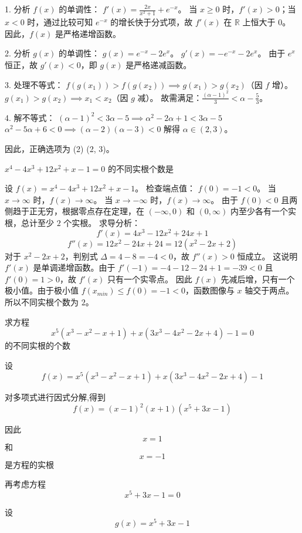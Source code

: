 \begin{questions}
\begin{solution}
1. 分析 $f(x)$ 的单调性：
$f'(x) = \frac{2x}{x^2+1} + e^{-x}$。
当 $x \geq 0$ 时，$f'(x) > 0$；当 $x < 0$ 时，通过比较可知 $e^{-x}$ 的增长快于分式项，故 $f'(x)$ 在 $\mathbb{R}$ 上恒大于 0。
因此，$f(x)$ 是严格递增函数。

2. 分析 $g(x)$ 的单调性：
$g(x) = e^{-x} - 2e^x$。
$g'(x) = -e^{-x} - 2e^x$。
由于 $e^x$ 恒正，故 $g'(x) < 0$，即 $g(x)$ 是严格递减函数。

3. 处理不等式：
$f(g(x_1)) > f(g(x_2)) \implies g(x_1) > g(x_2)$（因 $f$ 增）。
$g(x_1) > g(x_2) \implies x_1 < x_2$（因 $g$ 减）。
故需满足：$\frac{(\alpha-1)^2}{3} < \alpha - \frac{5}{3}$。

4. 解不等式：
$(\alpha-1)^2 < 3\alpha - 5 \implies \alpha^2 - 2\alpha + 1 < 3\alpha - 5$
$\alpha^2 - 5\alpha + 6 < 0 \implies (\alpha-2)(\alpha-3) < 0$
解得 $\alpha \in (2, 3)$。

因此，正确选项为 (2) (2, 3)。
\end{solution}

\question $x^4 - 4x^3 + 12x^2 + x - 1 = 0$ 的不同实根个数是

\begin{solution}
设 $f(x) = x^4 - 4x^3 + 12x^2 + x - 1$。
检查端点值：
$f(0) = -1 < 0$。
当 $x \to \infty$ 时，$f(x) \to \infty$。
当 $x \to -\infty$ 时，$f(x) \to \infty$。
由于 $f(0) < 0$ 且两侧趋于正无穷，根据零点存在定理，在 $(-\infty, 0)$ 和 $(0, \infty)$ 内至少各有一个实根，总计至少 $2$ 个实根。
求导分析：
\[
f'(x) = 4x^3 - 12x^2 + 24x + 1
\]
\[
f''(x) = 12x^2 - 24x + 24 = 12\left(x^2 - 2x + 2\right)
\]
对于 $x^2 - 2x + 2$，判别式 $\Delta = 4 - 8 = -4 < 0$，故 $f''(x) > 0$ 恒成立。
这说明 $f'(x)$ 是单调递增函数。由于 $f'(-1) = -4-12-24+1 = -39 < 0$ 且 $f'(0) = 1 > 0$，故 $f'(x)$ 只有一个实零点。
因此 $f(x)$ 先减后增，只有一个极小值。由于极小值 $f(x_{min}) \le f(0) = -1 < 0$，函数图像与 $x$ 轴交于两点。
所以不同实根个数为 $2$。
\end{solution}

\question
求方程
\[
x^5(x^3-x^2-x+1)+x(3x^3-4x^2-2x+4)-1=0
\]
的不同实根的个数

\begin{solution}
设
\[
f(x)=x^5(x^3-x^2-x+1)+x(3x^3-4x^2-2x+4)-1
\]

对多项式进行因式分解,得到
\[
f(x)=(x-1)^2(x+1)(x^5+3x-1)
\]

因此
\[
x=1
\]
和
\[
x=-1
\]
是方程的实根

再考虑方程
\[
x^5+3x-1=0
\]

设
\[
g(x)=x^5+3x-1
\]


\end{solution}
\end{questions}
